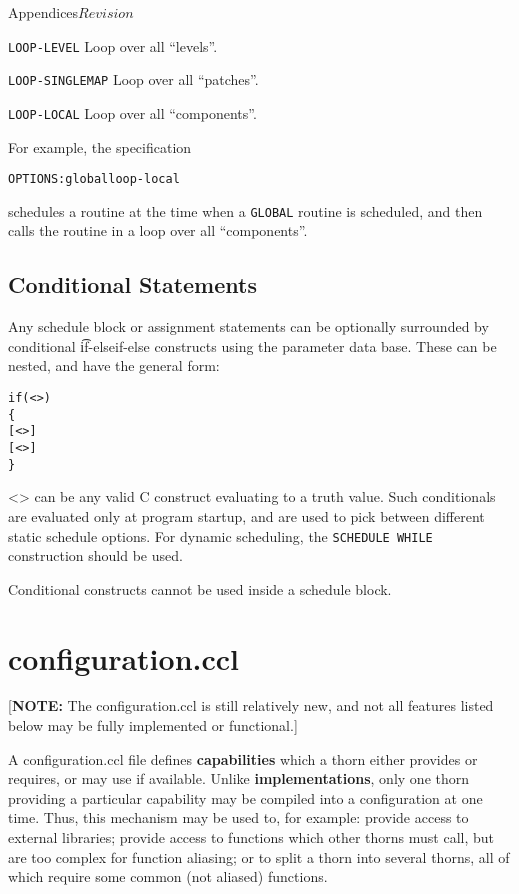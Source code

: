 \begin{cactuspart}{Appendices}{}{$Revision$}
\begin{Lentry}
\item[{\tt LOOP-LEVEL}] Loop over all ``levels''.
  
\item[{\tt LOOP-SINGLEMAP}] Loop over all ``patches''.
  
\item[{\tt LOOP-LOCAL}] Loop over all ``components''.

\end{Lentry}

For example, the specification
\begin{alltt}
  OPTIONS: global loop-local
\end{alltt}
schedules a routine at the time when a \texttt{GLOBAL} routine is
scheduled, and then calls the routine in a loop over all
``components''.


\subsection{Conditional Statements}

Any schedule block or assignment statements can be optionally
surrounded by conditional {\t if-elseif-else}
constructs using the parameter data base. These can be nested,
and have the general form:

\begin{alltt}
if (<>)
\{
  [<>]
  [<>]
\}\end{alltt}

<> can be any valid C construct evaluating
to a truth value.
Such conditionals are evaluated only at program startup, and are used
to pick between different static schedule options.  For dynamic
scheduling, the {\tt SCHEDULE WHILE} construction should be used.

Conditional constructs cannot be used inside a schedule block.


\section{configuration.ccl}
\label{sec:Appendix.configuration.ccl}

[{\bf NOTE:} The configuration.ccl is still relatively new, and not
all features listed below may be fully implemented or functional.]

A configuration.ccl file defines {\bf capabilities} which a thorn
either provides or requires, or may use if available.  Unlike {\bf
implementations}, only one thorn providing a particular capability may
be compiled into a configuration at one time.  Thus, this mechanism may
be used to, for example: provide access to external libraries; provide
access to functions which other thorns must call, but are too complex
for function aliasing; or to split a thorn into several thorns, all of
which require some common (not aliased) functions.


\end{cactuspart}
